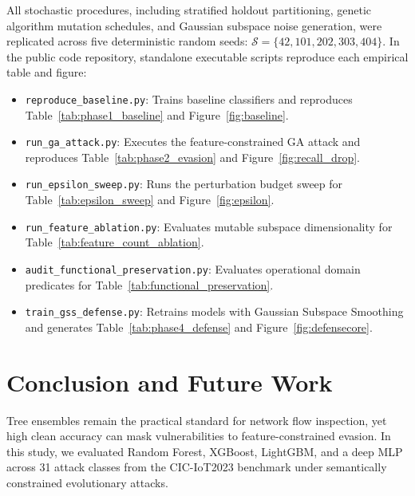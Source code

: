 \documentclass[iicol,pdflatex,sn-mathphys-num]{sn-jnl}
\begin{document}
All stochastic procedures, including stratified holdout partitioning, genetic algorithm mutation schedules, and Gaussian subspace noise generation, were replicated across five deterministic random seeds: $\mathcal{S} = \{42, 101, 202, 303, 404\}$. In the public code repository, standalone executable scripts reproduce each empirical table and figure:
\begin{itemize}\setlength{\itemsep}{1pt}\setlength{\parskip}{0pt}
    \item \texttt{reproduce\_baseline.py}: Trains baseline classifiers and reproduces Table~\ref{tab:phase1_baseline} and Figure~\ref{fig:baseline}.
    \item \texttt{run\_ga\_attack.py}: Executes the feature-constrained GA attack and reproduces Table~\ref{tab:phase2_evasion} and Figure~\ref{fig:recall_drop}.
    \item \texttt{run\_epsilon\_sweep.py}: Runs the perturbation budget sweep for Table~\ref{tab:epsilon_sweep} and Figure~\ref{fig:epsilon}.
    \item \texttt{run\_feature\_ablation.py}: Evaluates mutable subspace dimensionality for Table~\ref{tab:feature_count_ablation}.
    \item \texttt{audit\_functional\_preservation.py}: Evaluates operational domain predicates for Table~\ref{tab:functional_preservation}.
    \item \texttt{train\_gss\_defense.py}: Retrains models with Gaussian Subspace Smoothing and generates Table~\ref{tab:phase4_defense} and Figure~\ref{fig:defensecore}.
\end{itemize}

\section{Conclusion and Future Work}
\label{sec:conclusion}

Tree ensembles remain the practical standard for network flow inspection, yet high clean accuracy can mask vulnerabilities to feature-constrained evasion. In this study, we evaluated Random Forest, XGBoost, LightGBM, and a deep MLP across 31 attack classes from the CIC-IoT2023 benchmark under semantically constrained evolutionary attacks.
\end{document}
